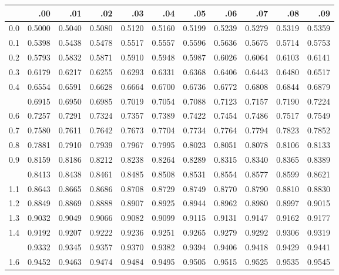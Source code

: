 \documentclass[]{article}
\begin{document}
\begin{table}[H]
\centering
\begin{tabular}{lrrrrrrrrrr}
\toprule
  & .00 & .01 & .02 & .03 & .04 & .05 & .06 & .07 & .08 & .09\\
\midrule
0.0 & 0.5000 & 0.5040 & 0.5080 & 0.5120 & 0.5160 & 0.5199 & 0.5239 & 0.5279 & 0.5319 & 0.5359\\
0.1 & 0.5398 & 0.5438 & 0.5478 & 0.5517 & 0.5557 & 0.5596 & 0.5636 & 0.5675 & 0.5714 & 0.5753\\
0.2 & 0.5793 & 0.5832 & 0.5871 & 0.5910 & 0.5948 & 0.5987 & 0.6026 & 0.6064 & 0.6103 & 0.6141\\
0.3 & 0.6179 & 0.6217 & 0.6255 & 0.6293 & 0.6331 & 0.6368 & 0.6406 & 0.6443 & 0.6480 & 0.6517\\
0.4 & 0.6554 & 0.6591 & 0.6628 & 0.6664 & 0.6700 & 0.6736 & 0.6772 & 0.6808 & 0.6844 & 0.6879\\
\addlinespace
0.5 & 0.6915 & 0.6950 & 0.6985 & 0.7019 & 0.7054 & 0.7088 & 0.7123 & 0.7157 & 0.7190 & 0.7224\\
0.6 & 0.7257 & 0.7291 & 0.7324 & 0.7357 & 0.7389 & 0.7422 & 0.7454 & 0.7486 & 0.7517 & 0.7549\\
0.7 & 0.7580 & 0.7611 & 0.7642 & 0.7673 & 0.7704 & 0.7734 & 0.7764 & 0.7794 & 0.7823 & 0.7852\\
0.8 & 0.7881 & 0.7910 & 0.7939 & 0.7967 & 0.7995 & 0.8023 & 0.8051 & 0.8078 & 0.8106 & 0.8133\\
0.9 & 0.8159 & 0.8186 & 0.8212 & 0.8238 & 0.8264 & 0.8289 & 0.8315 & 0.8340 & 0.8365 & 0.8389\\
\addlinespace
1.0 & 0.8413 & 0.8438 & 0.8461 & 0.8485 & 0.8508 & 0.8531 & 0.8554 & 0.8577 & 0.8599 & 0.8621\\
1.1 & 0.8643 & 0.8665 & 0.8686 & 0.8708 & 0.8729 & 0.8749 & 0.8770 & 0.8790 & 0.8810 & 0.8830\\
1.2 & 0.8849 & 0.8869 & 0.8888 & 0.8907 & 0.8925 & 0.8944 & 0.8962 & 0.8980 & 0.8997 & 0.9015\\
1.3 & 0.9032 & 0.9049 & 0.9066 & 0.9082 & 0.9099 & 0.9115 & 0.9131 & 0.9147 & 0.9162 & 0.9177\\
1.4 & 0.9192 & 0.9207 & 0.9222 & 0.9236 & 0.9251 & 0.9265 & 0.9279 & 0.9292 & 0.9306 & 0.9319\\
\addlinespace
1.5 & 0.9332 & 0.9345 & 0.9357 & 0.9370 & 0.9382 & 0.9394 & 0.9406 & 0.9418 & 0.9429 & 0.9441\\
1.6 & 0.9452 & 0.9463 & 0.9474 & 0.9484 & 0.9495 & 0.9505 & 0.9515 & 0.9525 & 0.9535 & 0.9545\\

\end{tabular}
\end{table}
\end{document}
